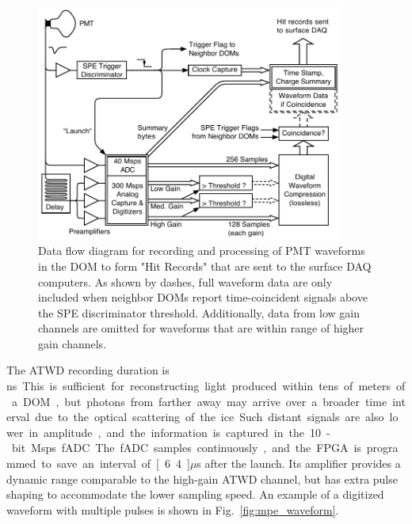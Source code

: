 \begin{figure}[h]
 \centering
 \includegraphics[width=0.9\textwidth]{graphics/dom/functional/domfig3-DOMDataFlow.pdf}
 \caption{Data flow diagram for recording and processing of PMT waveforms in the DOM to form 
 "Hit Records" that are sent to the surface DAQ computers.  As shown by dashes, full waveform data are only included
 when neighbor DOMs report time-coincident signals above the SPE discriminator threshold.  Additionally,
 data from low gain channels are omitted for waveforms that are within range of higher gain channels.}
 \label{fig:domdataflow}
\end{figure}

The ATWD recording duration is \unit[427]ns.  This is sufficient for
reconstructing light produced within tens of meters of
a DOM, but photons from farther away may arrive over a broader time
interval due to the optical scattering of the ice.  Such distant signals are
also lower in amplitude, and the information is captured in the 10-bit \unit[40]Msps fADC.
The fADC samples continuously, and the FPGA is programmed to save an
interval of \unit[6.4]$\mu$s after the launch. Its amplifier provides a
dynamic range comparable to the high-gain ATWD channel, but has extra pulse shaping to accommodate the lower
sampling speed. An example of a digitized waveform with multiple pulses is shown in
Fig.~\ref{fig:mpe_waveform}.

